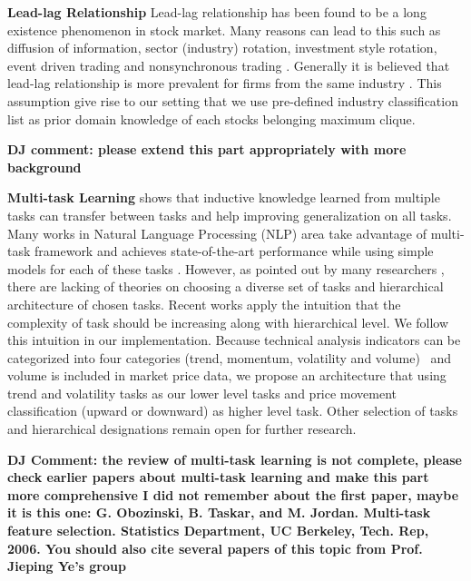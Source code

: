 \documentclass[sigconf, anonymous, review]{acmart}
\renewcommand{\citename}{\citet}
\renewcommand{\cite}{\citep}
\begin{document}
\textbf{Lead-lag Relationship} Lead-lag relationship has been
found to be a long existence phenomenon in stock market. Many
reasons can lead to this such as diffusion of information, sector
(industry) rotation, investment style rotation, event driven
trading and nonsynchronous trading
\cite{lo1990contrarian,chordia2000trading,conrad1988time,hameed1997time}.
Generally it is believed that lead-lag relationship is more
prevalent for firms from the same industry
\cite{hou2007industry}. This assumption give rise to our setting
that we use pre-defined industry classification list \cite{ths}
as prior domain knowledge of each stock\textquotesingle s belonging maximum
clique.

\textbf{DJ comment: please extend this part appropriately with more background}

\textbf{Multi-task Learning} \citename{caruana1993multitask}
shows that inductive knowledge learned from multiple tasks can
transfer between tasks and help improving generalization on all
tasks. Many works in Natural Language Processing (NLP) area take
advantage of multi-task framework and achieves state-of-the-art
performance while using simple models for each of these tasks
\cite{sogaard2016deep,hashimoto2016joint}. However, as pointed
out by many researchers
\cite{caruana1993multitask,ruder2017overview}, there are lacking
of theories on choosing a diverse set of tasks and hierarchical
architecture of chosen tasks. Recent works
\cite{sogaard2016deep,hashimoto2016joint} apply the intuition
that the complexity of task should be increasing along with
hierarchical level. We follow this intuition in our
implementation. Because technical analysis indicators can be
categorized into four categories (trend, momentum, volatility and
volume)~\cite{kirkpatrick2010technical} and volume is included in
market price data, we propose an architecture that using trend
and volatility tasks as our lower level tasks and price movement
classification (upward or downward) as higher level task. Other
selection of tasks and hierarchical designations remain open for
further research.

\textbf{DJ Comment: the review of multi-task learning is not complete, please check earlier papers about multi-task learning and make this part more comprehensive I did not remember about the first paper, maybe it is this one: G. Obozinski, B. Taskar, and M. Jordan. Multi-task feature selection. Statistics Department, UC Berkeley,
Tech. Rep, 2006. You should also cite several papers of this topic from Prof. Jieping Ye's group}
\end{document}
